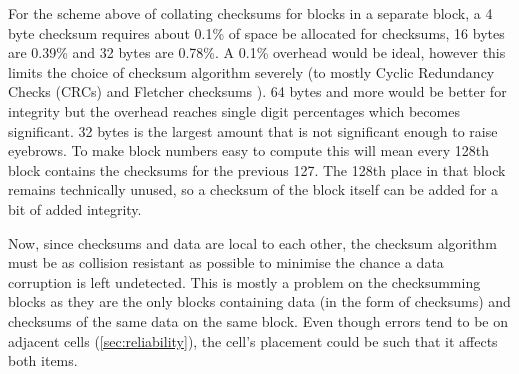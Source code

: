         For the scheme above of collating checksums for blocks in a separate
        block, a 4 byte checksum requires about 0.1\% of space be allocated for
        checksums, 16 bytes are 0.39\% and 32 bytes are 0.78\%. A 0.1\%
        overhead would be ideal, however this limits the choice of checksum
        algorithm severely (to mostly Cyclic Redundancy Checks (CRCs) and
        Fletcher checksums \cite{embedded_checksums}). 64 bytes and more would
        be better for integrity but the overhead reaches single digit
        percentages which becomes significant. 32 bytes is the largest amount
        that is not significant enough to raise eyebrows. To make block numbers
        easy to compute this will mean every 128th block contains the checksums
        for the previous 127. The 128th place in that block remains technically
        unused, so a checksum of the block itself can be added for a bit of
        added integrity.

        Now, since checksums and data are local to each other, the checksum
        algorithm must be as collision resistant as possible to minimise the
        chance a data corruption is left undetected. This is mostly a problem
        on the checksumming blocks as they are the only blocks containing data
        (in the form of checksums) and checksums of the same data on the same
        block. Even though errors tend to be on adjacent cells
        (\autoref{sec:reliability}), the cell's placement could be such that it
        affects both items.


